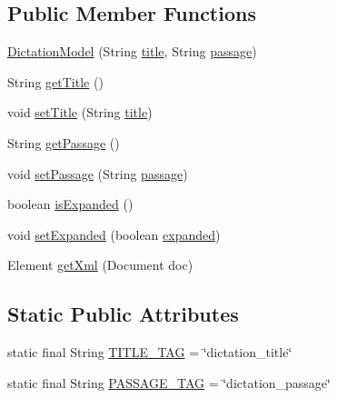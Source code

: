 \subsection*{Public Member Functions}
\begin{DoxyCompactItemize}
\item 
\hyperlink{classorg_1_1buildmlearn_1_1toolkit_1_1templates_1_1DictationModel_ade4217f9c69552f1e828effe922384fb}{Dictation\+Model} (String \hyperlink{classorg_1_1buildmlearn_1_1toolkit_1_1templates_1_1DictationModel_a4d4accc8a072d6f95c93fb2e9a5d7797}{title}, String \hyperlink{classorg_1_1buildmlearn_1_1toolkit_1_1templates_1_1DictationModel_a1672904be7ce2e6b0c4a70fdd64bacad}{passage})
\item 
String \hyperlink{classorg_1_1buildmlearn_1_1toolkit_1_1templates_1_1DictationModel_ae9211614ff6e773b064e4d2247345d3b}{get\+Title} ()
\item 
void \hyperlink{classorg_1_1buildmlearn_1_1toolkit_1_1templates_1_1DictationModel_a89e1730e6eaa00f72f1e3163743c57c3}{set\+Title} (String \hyperlink{classorg_1_1buildmlearn_1_1toolkit_1_1templates_1_1DictationModel_a4d4accc8a072d6f95c93fb2e9a5d7797}{title})
\item 
String \hyperlink{classorg_1_1buildmlearn_1_1toolkit_1_1templates_1_1DictationModel_a4856c81ee471cb2a2bc32b1cca43a053}{get\+Passage} ()
\item 
void \hyperlink{classorg_1_1buildmlearn_1_1toolkit_1_1templates_1_1DictationModel_a29848fbaae358231e75d684ab2c0568b}{set\+Passage} (String \hyperlink{classorg_1_1buildmlearn_1_1toolkit_1_1templates_1_1DictationModel_a1672904be7ce2e6b0c4a70fdd64bacad}{passage})
\item 
boolean \hyperlink{classorg_1_1buildmlearn_1_1toolkit_1_1templates_1_1DictationModel_acf605c98d0f64df65e2013fd8527b195}{is\+Expanded} ()
\item 
void \hyperlink{classorg_1_1buildmlearn_1_1toolkit_1_1templates_1_1DictationModel_a05cf1963b3bb8fb918b3391a6e7e6d63}{set\+Expanded} (boolean \hyperlink{classorg_1_1buildmlearn_1_1toolkit_1_1templates_1_1DictationModel_ac2c85fa066d4a6ea41657a7808c27530}{expanded})
\item 
Element \hyperlink{classorg_1_1buildmlearn_1_1toolkit_1_1templates_1_1DictationModel_a6a32aea08bd2e39bcc9ab3353d6da562}{get\+Xml} (Document doc)
\end{DoxyCompactItemize}
\subsection*{Static Public Attributes}
\begin{DoxyCompactItemize}
\item 
static final String \hyperlink{classorg_1_1buildmlearn_1_1toolkit_1_1templates_1_1DictationModel_aff457132695ced3adfbf905ae80e4003}{T\+I\+T\+L\+E\+\_\+\+T\+AG} = \char`\"{}dictation\+\_\+title\char`\"{}
\item 
static final String \hyperlink{classorg_1_1buildmlearn_1_1toolkit_1_1templates_1_1DictationModel_a61a19e3a41f1c0b50af345418eb162a5}{P\+A\+S\+S\+A\+G\+E\+\_\+\+T\+AG} = \char`\"{}dictation\+\_\+passage\char`\"{}
\end{DoxyCompactItemize}
